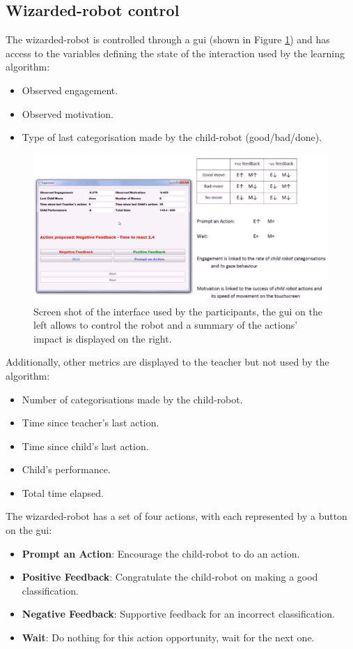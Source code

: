 \subsection{Wizarded-robot control}
\label{ssec:woz_wizarded_robot}
The wizarded-robot is controlled through a \gls{gui} (shown in Figure \ref{fig:woz_gui}) and has access to the variables defining the state of the interaction used by the learning algorithm:
\begin{itemize}
	\item Observed engagement.
	\item Observed motivation.
	\item Type of last categorisation made by the child-robot (good/bad/done).
\end{itemize}

\begin{figure}[ht]
	\centering
	\includegraphics[width=.9\textwidth]{GUI-woz.png}
	\caption{Screen shot of the interface used by the participants, the \gls{gui} on the left allows to control the robot and a summary of the actions' impact is displayed on the right.}
	\label{fig:woz_gui}
\end{figure}

Additionally, other metrics are displayed to the teacher but not used by the algorithm:
\begin{itemize}
	\item Number of categorisations made by the child-robot.
	\item Time since teacher's last action.
	\item Time since child's last action.
	\item Child's performance.
	\item Total time elapsed.
\end{itemize}


The wizarded-robot has a set of four actions, with each represented by a button on the \gls{gui}: 
\begin{itemize}
	\item \textbf{Prompt an Action}: Encourage the child-robot to do an action.
	\item \textbf{Positive Feedback}: Congratulate the child-robot on making a good classification.
	\item \textbf{Negative Feedback}: Supportive feedback for an incorrect classification.
	\item \textbf{Wait}: Do nothing for this action opportunity, wait for the next one.
\end{itemize}


